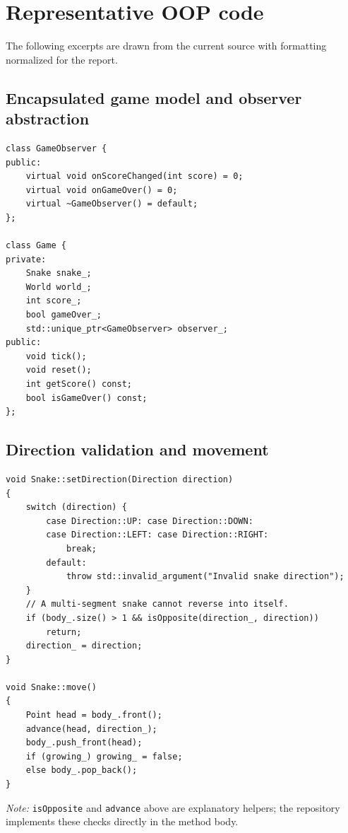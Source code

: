 \documentclass[12pt,a4paper]{report}
\begin{document}
\section{Representative OOP code}
The following excerpts are drawn from the current source with formatting
normalized for the report.

\subsection{Encapsulated game model and observer abstraction}
\begin{lstlisting}[caption={Game owns collaborators and exposes a narrow interface},label={lst:gameclass}]
class GameObserver {
public:
    virtual void onScoreChanged(int score) = 0;
    virtual void onGameOver() = 0;
    virtual ~GameObserver() = default;
};

class Game {
private:
    Snake snake_;
    World world_;
    int score_;
    bool gameOver_;
    std::unique_ptr<GameObserver> observer_;
public:
    void tick();
    void reset();
    int getScore() const;
    bool isGameOver() const;
};
\end{lstlisting}

\subsection{Direction validation and movement}
\begin{lstlisting}[caption={Snake validates directions and moves its deque body},label={lst:snake}]
void Snake::setDirection(Direction direction)
{
    switch (direction) {
        case Direction::UP: case Direction::DOWN:
        case Direction::LEFT: case Direction::RIGHT:
            break;
        default:
            throw std::invalid_argument("Invalid snake direction");
    }
    // A multi-segment snake cannot reverse into itself.
    if (body_.size() > 1 && isOpposite(direction_, direction))
        return;
    direction_ = direction;
}

void Snake::move()
{
    Point head = body_.front();
    advance(head, direction_);
    body_.push_front(head);
    if (growing_) growing_ = false;
    else body_.pop_back();
}
\end{lstlisting}
\textit{Note:} \texttt{isOpposite} and \texttt{advance} above are explanatory
helpers; the repository implements these checks directly in the method body.
\end{document}
